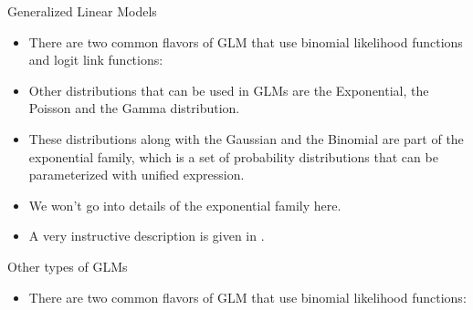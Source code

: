 \documentclass[handout]{beamer}
\begin{document}
\begin{frame}{Generalized Linear Models}
\scriptsize{
\begin{itemize}

\item There are two common flavors of GLM that use binomial likelihood functions and logit link functions:


\item Other distributions that can be used in GLMs are the Exponential, the Poisson and the Gamma distribution.

\item These distributions along with the Gaussian and the Binomial are part of the exponential family, which is a set of probability distributions that can be parameterized with unified expression.

\item We won't go into details of the exponential family here.

\item A very instructive description is given in \cite{ng2012cs229}.

\end{itemize}


}

\end{frame}


\begin{frame}{Other types of GLMs}
\scriptsize{
\begin{itemize}

\item There are two common flavors of GLM that use binomial likelihood functions:

\end{itemize}


}

\end{frame}
\end{document}
